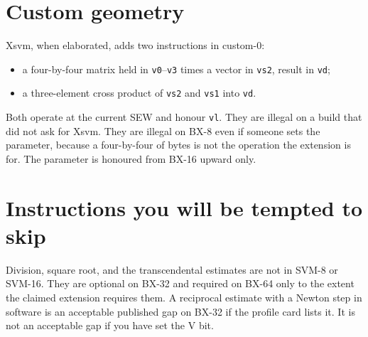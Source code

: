 \section{Custom geometry}

Xsvm, when elaborated, adds two instructions in custom-0:

\begin{itemize}[leftmargin=1.5em]
  \item a four-by-four matrix held in \texttt{v0}--\texttt{v3} times a vector in \texttt{vs2}, result in \texttt{vd};
  \item a three-element cross product of \texttt{vs2} and \texttt{vs1} into \texttt{vd}.
\end{itemize}

Both operate at the current SEW and honour \texttt{vl}. They are illegal on a build that did not ask for Xsvm. They are illegal on BX-8 even if someone sets the parameter, because a four-by-four of bytes is not the operation the extension is for. The parameter is honoured from BX-16 upward only.

\section{Instructions you will be tempted to skip}

Division, square root, and the transcendental estimates are not in SVM-8 or SVM-16. They are optional on BX-32 and required on BX-64 only to the extent the claimed extension requires them. A reciprocal estimate with a Newton step in software is an acceptable published gap on BX-32 if the profile card lists it. It is not an acceptable gap if you have set the V bit.
